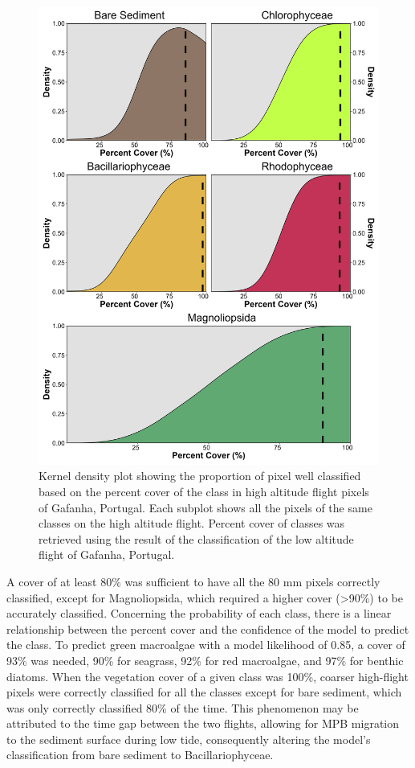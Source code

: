 \documentclass[
  letterpaper,
  11pt,
  english,
  singlespacing,
  headsepline]{MastersDoctoralThesis}
\begin{document}
\begin{spacing}{1.5}
\begin{figure}
{\includegraphics[width=0.95\linewidth,height=\textheight,keepaspectratio]{Chapter3/Figs/Figure12.png}

}

\caption{\label{fig-upscaling}Kernel density plot showing the proportion
of pixel well classified based on the percent cover of the class in high
altitude flight pixels of Gafanha, Portugal. Each subplot shows all the
pixels of the same classes on the high altitude flight. Percent cover of
classes was retrieved using the result of the classification of the low
altitude flight of Gafanha, Portugal.}

\end{figure}%

A cover of at least 80\% was sufficient to have all the 80 mm pixels
correctly classified, except for Magnoliopsida, which required a higher
cover (\textgreater90\%) to be accurately classified. Concerning the
probability of each class, there is a linear relationship between the
percent cover and the confidence of the model to predict the class. To
predict green macroalgae with a model likelihood of 0.85, a cover of
93\% was needed, 90\% for seagrass, 92\% for red macroalgae, and 97\%
for benthic diatoms. When the vegetation cover of a given class was
100\%, coarser high-flight pixels were correctly classified for all the
classes except for bare sediment, which was only correctly classified
80\% of the time. This phenomenon may be attributed to the time gap
between the two flights, allowing for MPB migration to the sediment
surface during low tide, consequently altering the model's
classification from bare sediment to Bacillariophyceae.


\end{spacing}
\end{document}
